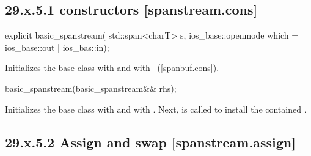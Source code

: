 \documentclass[ebook,11pt,article]{memoir}
\renewcommand{\iref}[1]{[#1]}
\begin{document}

\subsection{29.x.5.1  constructors [spanstream.cons]}
\label{spanstream.cons}

\begin{itemdecl}
explicit basic_spanstream(
  std::span<charT> s,
  ios_base::openmode which = ios_base::out | ios_bas::in);
\end{itemdecl}

\begin{itemdescr}
\pnum
\effects
Initializes the base class with
and  with
~(\iref{spanbuf.cons}).
\end{itemdescr}

\begin{itemdecl}
basic_spanstream(basic_spanstream&& rhs);
\end{itemdecl}

\begin{itemdescr}
\pnum
\effects Initializes the base class with  
and  with .
Next,  is called to
install the contained .
\end{itemdescr}

\subsection{29.x.5.2 Assign and swap [spanstream.assign]}
\label{spanstream.assign}
\end{document}
